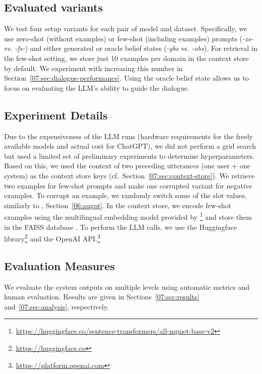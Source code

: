 \subsection{Evaluated variants}
We test four setup variants for each pair of model and dataset.
Specifically, we use zero-shot (without examples) or few-shot (including examples) prompts (\emph{-zs-} vs. \emph{-fs-}) and either generated or oracle belief states (\emph{-gbs} vs. \emph{-obs}).
For retrieval in the few-shot setting, we store just 10 examples per domain in the context store by default. We experiment with increasing this number in Section~\ref{07:sec:dialogue-performance}.
Using the oracle belief state allows us to focus on evaluating the LLM's ability to guide the dialogue.

\subsection{Experiment Details}
\label{subsec:exp-details}
Due to the expensiveness of the LLM runs (hardware requirements for the freely available models and actual cost for ChatGPT), we did not perform a grid search but used a limited set of preliminary experiments to determine hyperparameters.
Based on this, we used the context of two preceding utterances (one user + one system) as the context store keys (cf.~Section~\ref{07:sec:context-store}).
We retrieve two examples for few-shot prompts and make one corrupted variant for negative examples.
To corrupt an example, we randomly switch some of the slot values, similarly to \citet{kulhanek-etal-2021-augpt}, Section~\ref{06:augpt}.
In the context store, we encode few-shot examples using the multilingual embedding model provided by \citet{reimers-2020-multilingual-sentence-bert}\footnote{\url{https://huggingface.co/sentence-transformers/all-mpnet-base-v2}} and store them in the FAISS database \cite{johnson2019billion}.
To perform the LLM calls, we use the Huggingface library\footnote{\url{https://huggingface.co}} and the OpenAI API.\footnote{\url{https://platform.openai.com}}

\subsection{Evaluation Measures}

We evaluate the system outputs on multiple levels using automatic metrics and human evaluation. Results are given in Sections~\ref{07:sec:results} and~\ref{07:sec:analysis}, respectively.

